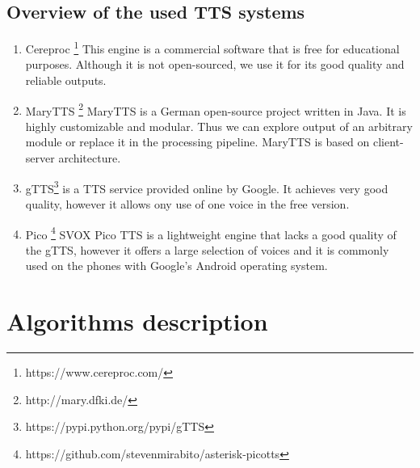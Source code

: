\subsection*{Overview of the used TTS systems}
\label{usedtts}
\begin{enumerate}
\item Cereproc \cite{aylett2007cerevoice} \footnote{https://www.cereproc.com/}
This engine is a commercial software that is free for educational purposes.
Although it is not open-sourced, we use it for its good quality and reliable outputs.
\item MaryTTS \cite{schroder2006openmary}\footnote{http://mary.dfki.de/} MaryTTS is a German open-source project written in Java.
It is highly customizable and modular.
Thus we can explore output of an arbitrary module or replace it in the processing pipeline.
MaryTTS is based on client-server architecture.
\item gTTS\footnote{https://pypi.python.org/pypi/gTTS} is a TTS service provided online by Google.
It achieves very good quality, however it allows ony use of one voice in the free version.
\item Pico \footnote{https://github.com/stevenmirabito/asterisk-picotts} SVOX Pico TTS is a lightweight engine that lacks a good quality of the gTTS, however it offers a large selection of voices and it is commonly used on the phones with Google's Android operating system.

\end{enumerate}
\section{Algorithms description}
